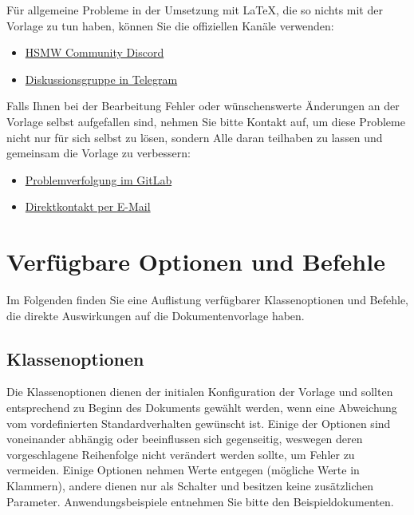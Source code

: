 \documentclass[
language=ngerman,	%
thesis=protokoll,		%
nomenclature,
%
	compactlistof,		%
%
	fancy,				%
%
%
	faculty=cb,			%
]{hsmw-vorlage-rw}
\begin{document}
	Für allgemeine Probleme in der Umsetzung mit LaTeX, die so nichts mit der Vorlage zu tun haben, können Sie die offiziellen Kanäle verwenden:
	\begin{itemize}
		\item \href{https://discord.com/channels/750860384126369822/765215969424834600}{HSMW Community Discord}
		\item \href{https://t.me/joinchat/Bxm0glfyeKXTM9OVlAhzJw}{Diskussionsgruppe in Telegram}
	\end{itemize}
	
	Falls Ihnen bei der Bearbeitung Fehler oder wünschenswerte Änderungen an der Vorlage selbst aufgefallen sind, nehmen Sie bitte Kontakt auf, um diese Probleme nicht nur für sich selbst zu lösen, sondern Alle daran teilhaben zu lassen und gemeinsam die Vorlage zu verbessern:
	\begin{itemize}
		\item \href{https://git.hs-mittweida.de/hsmw-latex/hsmw-thesis/-/issues}{Problemverfolgung im GitLab}
		\item \href{mailto:schildba@hs-mittweida.de?subject=[LaTeX] Vorlage Abschlussarbeiten}{Direktkontakt per E-Mail}
	\end{itemize}
	
	
	
	\chapter{Verfügbare Optionen und Befehle}
	\label{cha:optionsAndCommands}
	
	Im Folgenden finden Sie eine Auflistung verfügbarer Klassenoptionen und Befehle, die direkte Auswirkungen auf die Dokumentenvorlage haben.
	
	\section{Klassenoptionen}
	
	Die Klassenoptionen dienen der initialen Konfiguration der Vorlage und sollten entsprechend zu Beginn des Dokuments gewählt werden, wenn eine Abweichung vom vordefinierten Standardverhalten gewünscht ist.
	Einige der Optionen sind voneinander abhängig oder beeinflussen sich gegenseitig, weswegen deren vorgeschlagene Reihenfolge nicht verändert werden sollte, um Fehler zu vermeiden.
	Einige Optionen nehmen Werte entgegen (mögliche Werte in Klammern), andere dienen nur als Schalter und besitzen keine zusätzlichen Parameter.
	Anwendungsbeispiele entnehmen Sie bitte den Beispieldokumenten.
	
\end{document}
